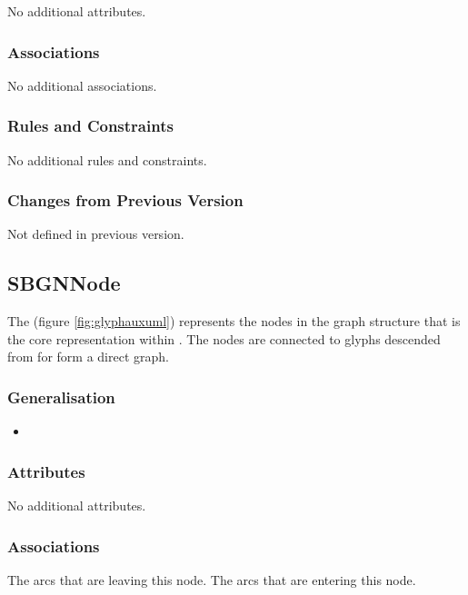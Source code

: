 No additional attributes.

\subsubsection{Associations}

No additional associations.

\subsubsection{Rules and Constraints}

No additional rules and constraints.

\subsubsection{Changes from Previous Version}

Not defined in previous version.


\subsection{SBGNNode}
\label{defn:SBGNNode}

The  (figure \ref{fig:glyphauxuml}) represents the nodes in the graph structure
that is the core representation within \PDl. The nodes are connected
to glyphs descended from  for form a direct graph.

\subsubsection{Generalisation}

\begin{itemize}
\item {}
\end{itemize}

\subsubsection{Attributes}

No additional attributes.

\subsubsection{Associations}

\begin{attributes}
   The arcs that are leaving this node.
   The arcs that are entering this node.
\end{attributes}
 
